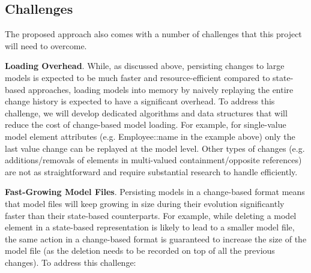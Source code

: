 \documentclass{llncs}
\begin{document}
\subsection{Challenges}
The proposed approach also comes with a number of challenges that this project will need to
overcome.

\textbf{Loading Overhead}. While, as discussed above, persisting changes to large models is expected
to be much faster and resource-efficient compared to state-based approaches, loading models into
memory by naively replaying the entire change history is expected to have a significant overhead. To
address this challenge, we will develop dedicated algorithms and data structures that will reduce the cost of change-based model loading. For example, for single-value model element attributes (e.g. Employee::name
in the example above) only the last value change can be replayed at the model level. Other types of changes (e.g. additions/removals of elements in multi-valued containment/opposite references) are not as straightforward and require substantial research to handle efficiently.

\textbf{Fast-Growing Model Files}. Persisting models in a change-based format means that model files will
keep growing in size during their evolution significantly faster than their state-based counterparts.
For example, while deleting a model element in a state-based representation is likely to lead to a
smaller model file, the same action in a change-based format is guaranteed to increase the size of
the model file (as the deletion needs to be recorded on top of all the previous changes). To address
this challenge:
\end{document}
